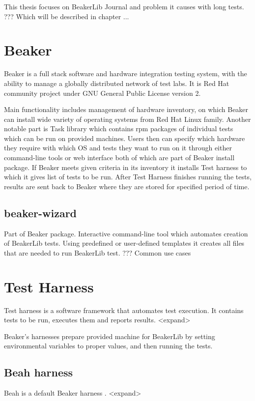 This thesis focuses on BeakerLib Journal and problem it causes with long tests. ??? Which will be described in chapter ...


\section{Beaker}

Beaker\cite{beaker_doc} is a full stack software and hardware integration testing system, with the ability to manage a globally distributed network of test labs.  It is Red Hat community project under GNU General Public License version 2.

Main functionality includes management of hardware inventory, on which Beaker can install wide variety  of operating systems from Red Hat Linux family. Another notable part  is Task library which contains rpm packages of individual tests which can be run on provided machines. 
Users then can specify which hardware they require with which OS and tests they want to run on it through either command-line tools or web interface both of which are part of Beaker install package. If Beaker meets given criteria in its inventory it installs Test harness to which it gives list of tests to be run.  After Test Harness finishes running the tests, results are sent back to Beaker where they are stored for specified period of time. 

\subsection{beaker-wizard}
Part of Beaker package. Interactive command-line tool which automates creation of BeakerLib tests. Using predefined or user-defined templates it creates all files that are needed to run BeakerLib test. 
???  Common use cases

\section{Test Harness}
Test harness is a software framework that automates test execution. It contains tests to be run, executes them and reports results. <expand>

Beaker’s harnesses prepare provided machine for BeakerLib by setting environmental variables to proper values, and then running the tests.

\subsection{Beah harness}
Beah \cite{beah_doc} is a default Beaker harness . <expand> 

